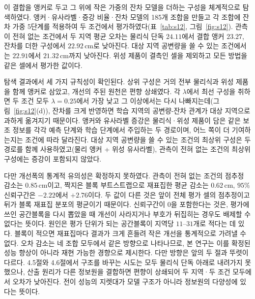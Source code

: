 \documentclass[10pt,twocolumn]{article}
\begin{document}
이 결합을 앵커로 두고 그 위에 작은 가중의 잔차 모델을 더하는 구성을 체계적으로 탐색하였다. 앵커·유사라벨·증강 비율·잔차 모델의 185개 조합을 만들고 각 조합에 잔차 가중 5단계를 적용하여 두 조건에서 평가하였다(표~\ref{tab:s12}, 그림~\ref{fig:s12}). 관측이 전혀 없는 조건에서 두 지역 평균 오차는 물리식 단독 $24.11$에서 결합 앵커 $23.27$, 잔차를 더한 구성에서 $22.92\,\mathrm{cm}$로 낮아진다. 대상 지역 공변량을 쓸 수 있는 조건에서는 $22.91$에서 $21.32\,\mathrm{cm}$까지 낮아진다. 위성 제품이 결측인 셀을 제외하고 모든 방법을 같은 셀에서 평가한 값이다.

탐색 결과에서 세 가지 규칙성이 확인된다. 상위 구성은 거의 전부 물리식과 위성 제품을 함께 앵커로 삼았고, 개선의 주된 원천은 편향 상쇄였다. 각 $\lambda$에서 최선 구성을 취하면 두 조건 모두 $\lambda{=}0.25$에서 가장 낮고 그 이상에서는 다시 나빠지는데(그림~\ref{fig:s12}(d)), 잔차를 크게 반영하면 학습 지역의 공변량-잔차 관계가 대상 지역으로 과하게 옮겨지기 때문이다. 앵커와 유사라벨 증강은 물리식·위성 제품이 담은 같은 보조 정보를 각각 예측 단계와 학습 단계에서 주입하는 두 경로이며, 어느 쪽이 더 기여하는지는 조건에 따라 달라진다. 대상 지역 공변량을 쓸 수 있는 조건의 최상위 구성은 두 경로를 함께 사용하였고(물리 앵커 + 위성 유사라벨), 관측이 전혀 없는 조건의 최상위 구성에는 증강이 포함되지 않았다.

다만 개선폭의 통계적 유의성은 확정하지 못하였다. 관측이 전혀 없는 조건의 점추정 감소는 $0.85\,\mathrm{cm}$이고, 짝지은 블록 부트스트랩으로 재표집한 평균 감소는 $0.62\,\mathrm{cm}$, $95\%$ 신뢰구간은 $-2.22$에서 $+2.76$이다. 두 값이 다른 것은 앞이 전체 평가 셀의 점추정이고 뒤가 블록 재표집 분포의 평균이기 때문이다. 신뢰구간이 $0$을 포함한다는 것은, 평가에 쓰인 공간블록을 다시 뽑았을 때 개선이 사라지거나 부호가 뒤집히는 경우도 배제할 수 없다는 뜻이다. 원인은 평가 단위가 되는 공간블록이 지역당 $11\text{--}31$개로 적다는 데 있다. 블록이 적으면 재표집마다 결과가 크게 흔들려 작은 개선을 통계적으로 가려낼 수 없다. 오차 감소는 네 조합 모두에서 같은 방향으로 나타나므로, 본 연구는 이를 확정된 성능 향상이 아니라 재현 가능한 경향으로 제시한다. 다만 방향은 앞의 두 절과 뚜렷이 다르다. 4.5절와 4.6절에서 구조를 바꾸는 시도는 모두 물리식 단독 아래로 내려가지 못했으나, 산출 원리가 다른 정보원을 결합하면 편향이 상쇄되어 두 지역·두 조건 모두에서 오차가 낮아진다. 전이 성능의 지렛대가 모델 구조가 아니라 정보원의 다양성에 있다는 뜻이다.
\end{document}
